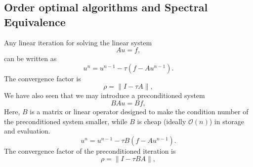 \documentclass[a4paper,11pt]{amsart}
\begin{document}
%
%
%
%
%
%
%

\subsection{Order optimal algorithms and Spectral Equivalence}


Any linear iteration for solving the linear system
\[
A u = f,
\]
can be written as
\[
u^n = u^{n-1}  - \tau (f - A u^{n-1}) .
\]
The convergence factor is
\[
\rho = \|I - \tau A \|,
\]
We have also seen that we may introduce a preconditioned system
\[
B A u = B f,
\]
Here, $B$ is a matrix or linear operator designed to make the condition number of the preconditioned system
smaller, while $B$ is cheap (ideally ${\mathcal O} (n)$) in storage and evaluation.
\[
u^n = u^{n-1}  - \tau B (f - A u^{n-1}) .
\]
The convergence factor of the preconditioned iteration is
\[
\rho = \|I - \tau B A \|,
\]
\end{document}
